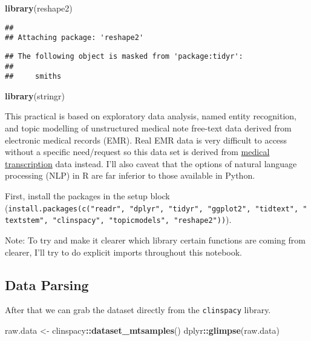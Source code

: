 \documentclass[
]{article}
\newenvironment{Shaded}{\begin{snugshade}}{\end{snugshade}}
\newcommand{\FunctionTok}[1]{\textcolor[rgb]{0.13,0.29,0.53}{\textbf{#1}}}
\newcommand{\NormalTok}[1]{#1}
\newcommand{\OtherTok}[1]{\textcolor[rgb]{0.56,0.35,0.01}{#1}}
\newcommand{\SpecialCharTok}[1]{\textcolor[rgb]{0.81,0.36,0.00}{\textbf{#1}}}
\newcommand{\StringTok}[1]{\textcolor[rgb]{0.31,0.60,0.02}{#1}}
\begin{document}
\begin{Shaded}
\begin{Highlighting}[]
\FunctionTok{library}\NormalTok{(}\StringTok{\textquotesingle{}reshape2\textquotesingle{}}\NormalTok{)}
\end{Highlighting}
\end{Shaded}

\begin{verbatim}
## 
## Attaching package: 'reshape2'
\end{verbatim}

\begin{verbatim}
## The following object is masked from 'package:tidyr':
## 
##     smiths
\end{verbatim}

\begin{Shaded}
\begin{Highlighting}[]
\FunctionTok{library}\NormalTok{(stringr)}
\end{Highlighting}
\end{Shaded}

This practical is based on exploratory data analysis, named entity
recognition, and topic modelling of unstructured medical note free-text
data derived from electronic medical records (EMR). Real EMR data is
very difficult to access without a specific need/request so this data
set is derived from \href{https://mtsamples.com/}{medical transcription}
data instead. I'll also caveat that the options of natural language
processing (NLP) in R are far inferior to those available in Python.

First, install the packages in the setup block
(\texttt{install.packages(c("readr",\ "dplyr",\ "tidyr",\ "ggplot2",\ "tidtext",\ "textstem",\ "clinspacy",\ "topicmodels",\ "reshape2"))}).

Note: To try and make it clearer which library certain functions are
coming from clearer, I'll try to do explicit imports throughout this
notebook.

\subsection{Data Parsing}\label{data-parsing}

After that we can grab the dataset directly from the \texttt{clinspacy}
library.

\begin{Shaded}
\begin{Highlighting}[]
\NormalTok{raw.data }\OtherTok{\textless{}{-}}\NormalTok{ clinspacy}\SpecialCharTok{::}\FunctionTok{dataset\_mtsamples}\NormalTok{()}
\NormalTok{dplyr}\SpecialCharTok{::}\FunctionTok{glimpse}\NormalTok{(raw.data)}
\end{Highlighting}
\end{Shaded}
\end{document}
